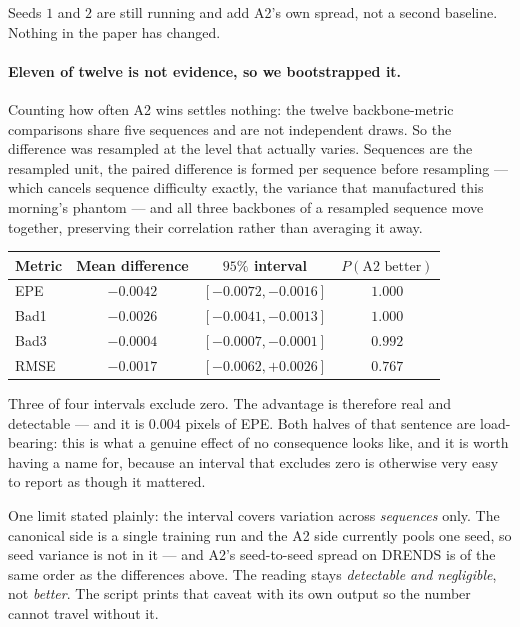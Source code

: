 \documentclass[11pt,a4paper]{article}
\begin{document}
Seeds $1$ and $2$ are still running and add A2's own spread, not a second
baseline. Nothing in the paper has changed.

\paragraph{Eleven of twelve is not evidence, so we bootstrapped it.}
Counting how often A2 wins settles nothing: the twelve backbone-metric
comparisons share five sequences and are not independent draws. So the
difference was resampled at the level that actually varies. Sequences are
the resampled unit, the paired difference is formed per sequence before
resampling --- which cancels sequence difficulty exactly, the variance
that manufactured this morning's phantom --- and all three backbones of a
resampled sequence move together, preserving their correlation rather than
averaging it away.

\begin{center}
\begin{tabular}{lccc}
\toprule
Metric & Mean difference & $95\%$ interval & $P(\text{A2 better})$ \\
\midrule
EPE  & $-0.0042$ & $[-0.0072, -0.0016]$ & $1.000$ \\
Bad1 & $-0.0026$ & $[-0.0041, -0.0013]$ & $1.000$ \\
Bad3 & $-0.0004$ & $[-0.0007, -0.0001]$ & $0.992$ \\
RMSE & $-0.0017$ & $[-0.0062, +0.0026]$ & $0.767$ \\
\bottomrule
\end{tabular}
\end{center}

Three of four intervals exclude zero. The advantage is therefore real and
detectable --- and it is $0.004$ pixels of EPE. Both halves of that
sentence are load-bearing: this is what a genuine effect of no consequence
looks like, and it is worth having a name for, because an interval that
excludes zero is otherwise very easy to report as though it mattered.

One limit stated plainly: the interval covers variation across
\emph{sequences} only. The canonical side is a single training run and the
A2 side currently pools one seed, so seed variance is not in it --- and
A2's seed-to-seed spread on DRENDS is of the same order as the differences
above. The reading stays \emph{detectable and negligible}, not
\emph{better}. The script prints that caveat with its own output so the
number cannot travel without it.
\end{document}
